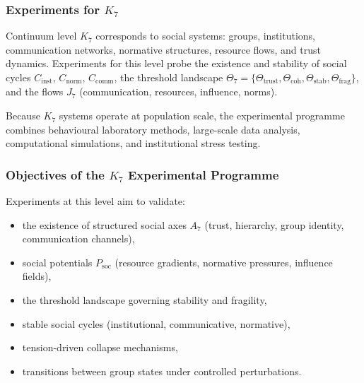 
\subsubsection{Experiments for \texorpdfstring{$K_7$}{K_7}}
\label{sec:experiments-k7}

Continuum level $K_7$ corresponds to social systems:
groups, institutions, communication networks, normative structures,
resource flows, and trust dynamics.  
Experiments for this level probe the existence and stability of
social cycles $C_{\mathrm{inst}}$, $C_{\mathrm{norm}}$, 
$C_{\mathrm{comm}}$, the threshold landscape 
$\Theta_7 = \{\Theta_{\mathrm{trust}}, \Theta_{\mathrm{coh}}, 
\Theta_{\mathrm{stab}}, \Theta_{\mathrm{frag}}\}$,
and the flows $J_7$ (communication, resources, influence, norms).

Because $K_7$ systems operate at population scale, the 
experimental programme combines behavioural laboratory methods,
large-scale data analysis, computational simulations, and 
institutional stress testing.



\subsubsection{Objectives of the \texorpdfstring{$K_7$}{K_7} Experimental Programme}

Experiments at this level aim to validate:

\begin{itemize}
    \item the existence of structured social axes $A_7$ 
          (trust, hierarchy, group identity, communication channels),
    \item social potentials $P_{\mathrm{soc}}$ (resource gradients, 
          normative pressures, influence fields),
    \item the threshold landscape governing stability and fragility,
    \item stable social cycles (institutional, communicative, normative),
    \item tension-driven collapse mechanisms,
    \item transitions between group states under controlled perturbations.
\end{itemize}



